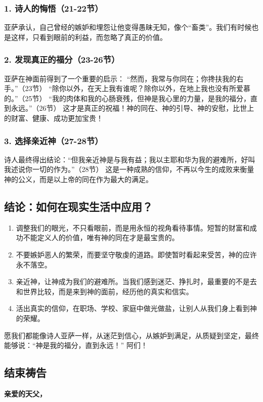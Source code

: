 \documentclass[a4paper, 12pt]{article}
\begin{document}
\subsubsection*{1. 诗人的悔悟（21-22节）}
亚萨承认，自己曾经的嫉妒和埋怨让他变得愚昧无知，像个“畜类”。我们有时候也是这样，只看到眼前的利益，而忽略了真正的价值。
\subsubsection*{2. 发现真正的福分（23-26节）}
亚萨在神面前得到了一个重要的启示：
“然而，我常与你同在；你搀扶我的右手。”（23节）
“除你以外，在天上我有谁呢？除你以外，在地上我也没有所爱慕的。”（25节）
“我的肉体和我的心肠衰残，但神是我心里的力量，是我的福分，直到永远。”（26节）
这才是真正的祝福！神的同在、神的引导、神的安慰，比世上的财富、健康、成功更加宝贵！
\subsubsection*{3. 选择亲近神（27-28节）}
诗人最终得出结论：“但我亲近神是与我有益；我以主耶和华为我的避难所，好叫我述说你一切的作为。”（28节）
这是一种成熟的信仰，不再以今生的成败来衡量神的公义，而是以上帝的同在作为最大的满足。
\subsection*{结论：如何在现实生活中应用？}
\begin{enumerate}
    \item 调整我们的眼光，不只看眼前，而是用永恒的视角看待事情。短暂的财富和成功不能定义人的价值，唯有神的同在才是最宝贵的。

    \item 不要嫉妒恶人的繁荣，而要坚守敬虔的道路。即使暂时看起来受苦，神的应许永不落空。

    \item 亲近神，让神成为我们的避难所。当我们感到迷茫、挣扎时，最重要的不是去和世界比较，而是来到神的面前，经历他的真实和信实。

    \item 活出真实的信仰，在职场、学校、家庭中做光做盐，让别人从我们身上看到神的荣耀。

\end{enumerate}

愿我们都能像诗人亚萨一样，从迷茫到信心，从嫉妒到满足，从质疑到坚定，最终能够说：“神是我的福分，直到永远！”
阿们！

\subsection*{结束祷告}
\textbf{亲爱的天父，}
\end{document}

